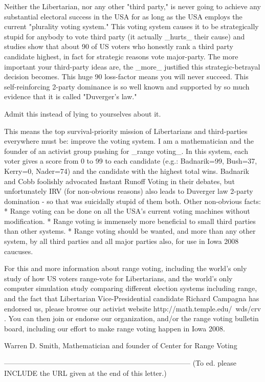 Neither the Libertarian, nor any other "third party,"  is never going to achieve
any substantial electoral success in the USA for as long as the USA employs
the current "plurality voting system."
This voting system causes it to be strategically stupid for anybody to vote
third party (it actually _hurts_ their cause) and studies show that about 90%
of US voters who honestly rank a third party candidate highest, in fact for 
strategic reasons vote major-party.  The more important your third-party ideas are, 
the _more_ justified this strategic-betrayal decision becomes.  This huge 90%
loss-factor means you will never succeed.  This self-reinforcing 2-party dominance
is so well known and supported by so much evidence that it is called "Duverger's law."

Admit this instead of lying to yourselves about it.

This means the top survival-priority mission of Libertarians and third-parties everywhere
must be: improve the voting system.    I am a mathematician and the founder
of an activist group pushing for _range voting_.  In this system, each voter
gives a score from 0 to 99 to each candidate 
(e.g.: Badnarik=99, Bush=37, Kerry=0, Nader=74)
and the candidate with the highest total wins. 
Badnarik and Cobb foolishly advocated Instant Runoff Voting in their debates,
but unfortunately IRV (for non-obvious reasons) also leads to Duverger
law 2-party domination - so that was suicidally stupid of them both.
Other non-obvious facts:
 * Range voting can be done on all the USA's current voting machines without modification.
 * Range voting is immensely more beneficial to small third parties than other systems.
 * Range voting should be wanted, and more than any other system, by all third
    parties and all major parties also, for use in Iowa 2008 caucuses.

For this and more information about range voting, including the world's only study 
of how US voters range-vote for Libertarians, and the world's only computer
simulation study comparing different election systems including range, and the fact that
Libertarian Vice-Presidential candidate Richard Campagna has endorsed us,
please browse our activist website
   http://math.temple.edu/~wds/crv .
You can then join or endorse our organization, and/or the range voting bulletin 
board, including our effort to make range voting happen in Iowa 2008.

Warren D. Smith,   Mathematician and founder of Center for Range Voting 

------------------------------------------------------------------------------
(To ed. please INCLUDE the URL given at the end of this letter.)


